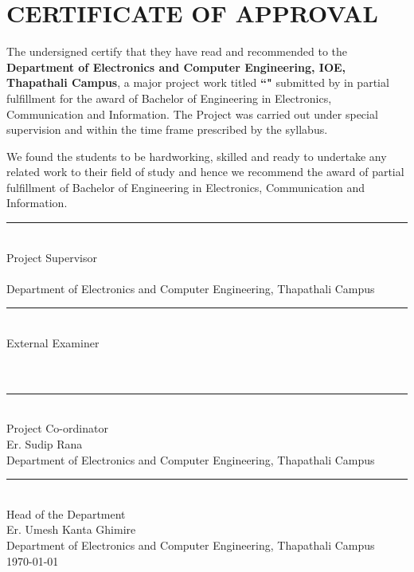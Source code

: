 \section*{CERTIFICATE OF APPROVAL}
    The undersigned certify that they have read and recommended to the \textbf{Department of Electronics and Computer Engineering, IOE, Thapathali Campus}, a major project work titled \textbf{``\titlename"} submitted by \textbf{\authornames} in partial fulfillment for the award of Bachelor of Engineering in Electronics, Communication and Information. The Project was carried out under special supervision and within the time frame prescribed by the syllabus.
    
    We found the students to be hardworking, skilled and ready to undertake any related work to their field of study and hence we recommend the award of partial fulfillment of Bachelor of Engineering in Electronics, Communication and Information. \\
    
    \rule{0.5\linewidth}{0.4pt}\\
    Project Supervisor\\
    \supervisorname\\
    Department of Electronics and Computer Engineering, Thapathali Campus\\

    \rule{0.5\linewidth}{0.4pt} \\
    External Examiner \\
     \\
     \\

    \rule{0.5\linewidth}{0.4pt} \\
    Project Co-ordinator\\
    Er. Sudip Rana \\
    Department of Electronics and Computer Engineering, Thapathali Campus\\

    \rule{0.5\linewidth}{0.4pt} \\
    Head of the Department \\ 
    Er. Umesh Kanta Ghimire \\ 
    Department of Electronics and Computer Engineering, Thapathali Campus\\

    \today
